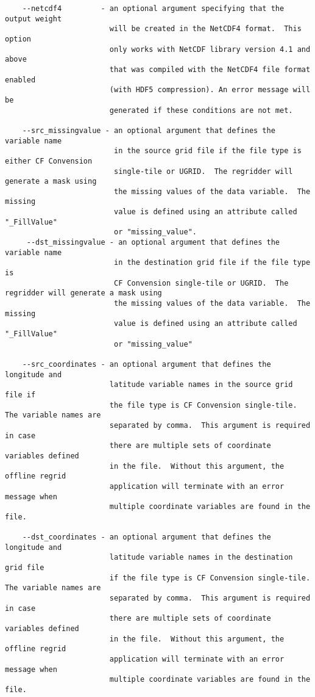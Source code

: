 \begin{verbatim}
    --netcdf4         - an optional argument specifying that the output weight
                        will be created in the NetCDF4 format.  This option 
                        only works with NetCDF library version 4.1 and above 
                        that was compiled with the NetCDF4 file format enabled 
                        (with HDF5 compression). An error message will be 
                        generated if these conditions are not met.

    --src_missingvalue - an optional argument that defines the variable name 
                         in the source grid file if the file type is either CF Convension
                         single-tile or UGRID.  The regridder will generate a mask using 
                         the missing values of the data variable.  The missing 
                         value is defined using an attribute called "_FillValue" 
                         or "missing_value". 
     --dst_missingvalue - an optional argument that defines the variable name
                         in the destination grid file if the file type is
                         CF Convension single-tile or UGRID.  The regridder will generate a mask using
                         the missing values of the data variable.  The missing
                         value is defined using an attribute called "_FillValue"
                         or "missing_value"

    --src_coordinates - an optional argument that defines the longitude and
                        latitude variable names in the source grid file if
                        the file type is CF Convension single-tile.  The variable names are
                        separated by comma.  This argument is required in case
                        there are multiple sets of coordinate variables defined
                        in the file.  Without this argument, the offline regrid
                        application will terminate with an error message when
                        multiple coordinate variables are found in the file.

    --dst_coordinates - an optional argument that defines the longitude and
                        latitude variable names in the destination grid file
                        if the file type is CF Convension single-tile.  The variable names are
                        separated by comma.  This argument is required in case
                        there are multiple sets of coordinate variables defined
                        in the file.  Without this argument, the offline regrid
                        application will terminate with an error message when
                        multiple coordinate variables are found in the file.


\end{verbatim}

